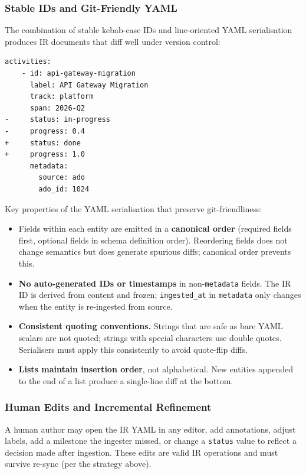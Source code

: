 \subsubsection{Stable IDs and Git-Friendly YAML}
\label{sec:stable-ids}

The combination of stable kebab-case IDs and line-oriented YAML serialisation produces
IR documents that diff well under version control:

\begin{lstlisting}[caption={Git diff of an IR update (status change + progress update)}]
  activities:
    - id: api-gateway-migration
      label: API Gateway Migration
      track: platform
      span: 2026-Q2
-     status: in-progress
-     progress: 0.4
+     status: done
+     progress: 1.0
      metadata:
        source: ado
        ado_id: 1024
\end{lstlisting}

Key properties of the YAML serialisation that preserve git-friendliness:

\begin{itemize}
  \item Fields within each entity are emitted in a \textbf{canonical order} (required
        fields first, optional fields in schema definition order). Reordering fields
        does not change semantics but does generate spurious diffs; canonical order
        prevents this.
  \item \textbf{No auto-generated IDs or timestamps} in non-\texttt{metadata} fields.
        The IR ID is derived from content and frozen; \texttt{ingested\_at} in
        \texttt{metadata} only changes when the entity is re-ingested from source.
  \item \textbf{Consistent quoting conventions.} Strings that are safe as bare YAML
        scalars are not quoted; strings with special characters use double quotes.
        Serialisers must apply this consistently to avoid quote-flip diffs.
  \item \textbf{Lists maintain insertion order}, not alphabetical. New entities appended
        to the end of a list produce a single-line diff at the bottom.
\end{itemize}

\subsubsection{Human Edits and Incremental Refinement}

A human author may open the IR YAML in any editor, add annotations, adjust labels,
add a milestone the ingester missed, or change a \texttt{status} value to reflect a
decision made after ingestion. These edits are valid IR operations and must survive
re-sync (per the strategy above).

